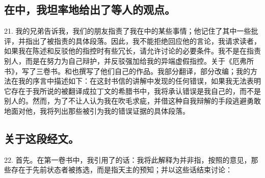 
\subsection{在中，我坦率地给出了等人的观点。}

21. 我的兄弟告诉我，我们的朋友指责了我在中的某些事情；他记住了其中一些批评，并指出了被指责的具体段落。因此，我不能拒绝回应他的言论，我请求读者，如果我在陈述和反驳他的指控时有些冗长，请允许讨论的必要条件。我不是在指责别人，而是在努力为自己辩护，并反驳强加给我的异端虚假指控。关于《厄弗所书》，写了三卷书。和也撰写了他们自己的作品。我部分翻译，部分改编；我的方法在我的序言中描述如下：在这封书信的讲解中发现的任何错误，如果我无法表明它存在于我所说的被翻译成拉丁文的希腊书中，我将承认错误是我自己的，而不是别人的。然而，为了不让人认为我在吹毛求疵，并借这种自我辩解的手段逃避勇敢地面对他，我将列出那些被引为我的错误证据的具体段落。\par


\subsection{关于这段经文。}

22. 首先。在第一卷书中，我引用了的话：我将此解释为并非指，按照的意见，那些存在于先前状态者被拣选，而是指天主的预知；并以这些话结束讨论：\par

\par

